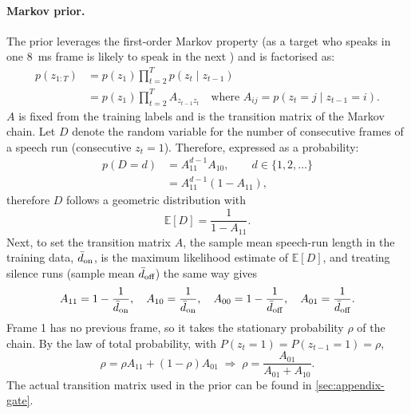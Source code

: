 \paragraph{Markov prior.} The prior leverages the first-order Markov property (as a target who speaks in one \SI{8}{\ms} frame is likely to speak in the next \cite{rabiner1989tutorial}) and is factorised as:
\begin{equation}
\begin{aligned}
  p(z_{1:T}) &= p(z_1) \prod_{t=2}^{T} p(z_t \mid z_{t-1}) \\
             &= p(z_1) \prod_{t=2}^{T} A_{z_{t-1} z_t} \quad \text{where } A_{ij} = p(z_t{=}j \mid z_{t-1}{=}i).
\end{aligned}
\label{eq:gate-prior-sequence}
\end{equation}
$A$ is fixed from the training labels and is the transition matrix of the Markov chain. Let $D$ denote the random variable for the number of consecutive frames of a speech run (consecutive $z_t = 1$). Therefore, expressed as a probability:
\begin{equation}
  \begin{aligned}
  p(D=d) &= A_{11}^{d-1} A_{10}, \qquad d \in \{1, 2, \dots\}\\
        &= A_{11}^{d-1} (1 - A_{11}),
  \end{aligned}
  \label{eq:gate-duration}
\end{equation}
therefore $D$ follows a geometric distribution with
\begin{equation}
  \mathbb{E}[D] = \frac{1}{1 - A_{11}}.
  \label{eq:gate-duration-mean}
\end{equation} 
Next, to set the transition matrix $A$, the sample mean speech-run length in the training data, $\bar{d}_\textup{on}$, is the maximum likelihood estimate of $\mathbb{E}[D]$, and treating silence runs (sample mean $\bar{d}_\textup{off}$) the same way gives
  \begin{equation}
  A_{11} = 1 - \frac{1}{\bar{d}_\textup{on}}, \quad
  A_{10} = \frac{1}{\bar{d}_\textup{on}}, \quad
  A_{00} = 1 - \frac{1}{\bar{d}_\textup{off}}, \quad
  A_{01} = \frac{1}{\bar{d}_\textup{off}}.
  \label{eq:transition-fit}
  \end{equation}
Frame 1 has no previous frame, so it takes the stationary probability $\rho$ of the chain. By the law of total probability, with $P(z_t = 1) = P(z_{t-1} = 1) = \rho$,
  \begin{equation} 
  \rho = \rho A_{11} + (1 - \rho) A_{01}
  \;\Longrightarrow\;
  \rho = \frac{A_{01}}{A_{01} + A_{10}}.
  \label{eq:stationary}
  \end{equation}
The actual transition matrix used in the prior can be found in \autoref{sec:appendix-gate}. 

